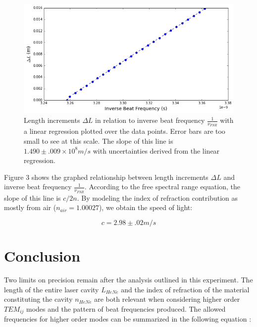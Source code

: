 \documentclass[journal, a4paper]{IEEEtran}
\begin{document}
\begin{figure}[!hbt]
		\begin{center}
		\includegraphics[width=\columnwidth]{deltaLbeat.png}
		\caption{Length increments $\Delta L$ in relation to inverse beat frequency $\frac{1}{\nu_{FSR}}$ with a linear regression plotted over the data points. Error bars are too small to see at this scale. The slope of this line is $ 1.490 \pm .009 \times 10^8 m/s$  with uncertainties derived from the linear regression.}
		
		\label{fig:tf_plot}
		\end{center}
	\end{figure}
Figure 3 shows the graphed relationship between length increments $\Delta L $ and inverse beat frequency $\frac{1}{\nu_{FSR}}$.  According to the free spectral range equation, the slope of this line is $c/2n$. By modeling the index of refraction contribution as mostly from air ($n_{air} = 1.00027$), we obtain the speed of light:

$$c = 2.98 \pm .02 m/s $$
\section{Conclusion}

Two limits on precision remain after the analysis outlined in this experiment. The length of the entire laser cavity $L_{HeNe}$ and the index of refraction of the material constituting the cavity $n_{HeNe}$ are both relevant when considering higher order $TEM_{ij}$ modes and the pattern of beat frequencies produced. The allowed frequencies for higher order modes can be summarized in the following equation \cite{beat}: 
\end{document}
